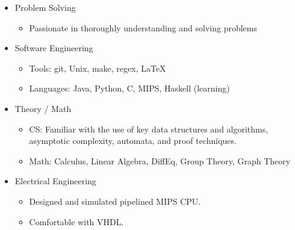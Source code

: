\documentclass[18pt]{article}
\providecommand{\tightlist}{
    \setlength{\itemsep}{0pt}\setlength{\parskip}{0pt}
}
\begin{document}
\begin{multicols}{2}
\begin{itemize}
        \item Problem Solving
        \begin{itemize}\tightlist
          \item Passionate in thoroughly understanding and solving problems
        \end{itemize}

        \item Software Engineering
        \begin{itemize}\tightlist
          \item Tools: git, Unix, make, regex, \LaTeX
          \item Languages: Java, Python, C, MIPS, Haskell (learning)
        \end{itemize}

        \item Theory / Math
        \begin{itemize}\tightlist
          \item CS: Familiar with the use of key data structures and algorithms, asymptotic complexity, automata, and proof techniques.
          \item Math: Calculus, Linear Algebra, DiffEq, Group Theory, Graph Theory
        \end{itemize}

        \item Electrical Engineering
        \begin{itemize}\tightlist
          \item Designed and simulated pipelined MIPS CPU.
          \item Comfortable with VHDL.
        \end{itemize}

      \end{itemize} %

  \end{multicols}
\end{document}
